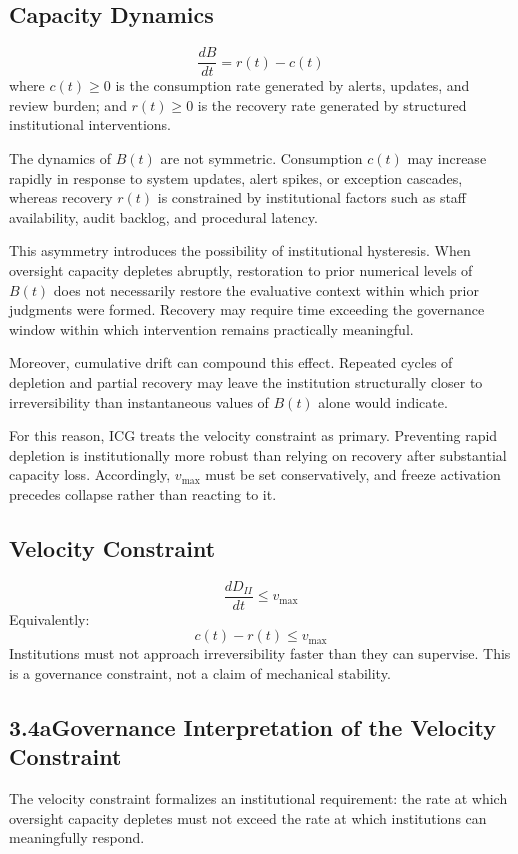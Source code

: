 \documentclass[12pt]{article}
\begin{document}
\subsection{Capacity Dynamics}
\[
\frac{dB}{dt} = r(t) - c(t)
\]
where $c(t) \geq 0$ is the consumption rate generated by alerts, updates, and review burden;
and $r(t) \geq 0$ is the recovery rate generated by structured institutional interventions.

The dynamics of $B(t)$ are not symmetric. Consumption $c(t)$ may increase rapidly in
response to system updates, alert spikes, or exception cascades, whereas recovery $r(t)$
is constrained by institutional factors such as staff availability, audit backlog, and
procedural latency.

This asymmetry introduces the possibility of institutional hysteresis. When oversight
capacity depletes abruptly, restoration to prior numerical levels of $B(t)$ does not
necessarily restore the evaluative context within which prior judgments were formed.
Recovery may require time exceeding the governance window within which intervention
remains practically meaningful.

Moreover, cumulative drift can compound this effect. Repeated cycles of depletion and
partial recovery may leave the institution structurally closer to irreversibility than
instantaneous values of $B(t)$ alone would indicate.

For this reason, ICG treats the velocity constraint as primary. Preventing rapid depletion
is institutionally more robust than relying on recovery after substantial capacity loss.
Accordingly, $v_{\max}$ must be set conservatively, and freeze activation precedes collapse
rather than reacting to it.

\subsection{Velocity Constraint}
\[
\frac{dD_{II}}{dt} \leq v_{\max}
\]
Equivalently:
\[
c(t) - r(t) \leq v_{\max}
\]
Institutions must not approach irreversibility faster than they can supervise.
This is a governance constraint, not a claim of mechanical stability.

\subsection*{3.4a\quad Governance Interpretation of the Velocity Constraint}

The velocity constraint formalizes an institutional requirement: the rate at which oversight
capacity depletes must not exceed the rate at which institutions can meaningfully respond.
\end{document}
